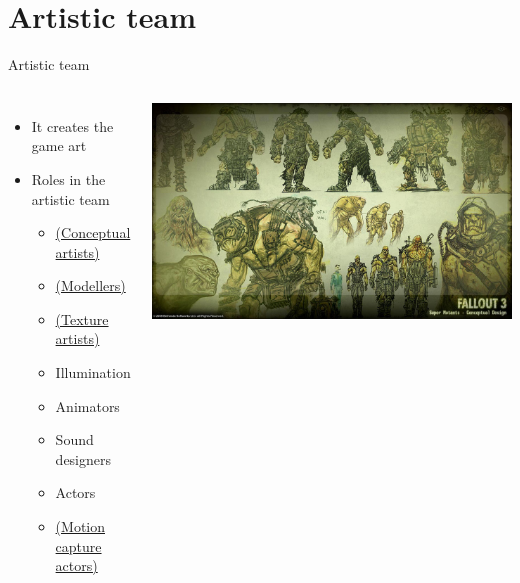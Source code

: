 \documentclass[10pt,compress]{beamer} %
\begin{document}
\section{Artistic team}
\begin{frame}{Artistic team}
    \begin{columns}
	\begin{itemize}
	\item It creates the game art
	\item Roles in the artistic team
		\begin{itemize}
		\item \href{https://www.google.es/search?espv=2&biw=1276&bih=702&tbm=isch&sa=1&q=arte+conceptual+videojuegos&oq=arte+conceptual+videojuegos&gs_l=img.3...0.0.0.116268.0.0.0.0.0.0.0.0..0.0.msedr...0...1c..64.img..0.0.0.8s-UmqTV-mo}{(Conceptual artists)}
		\item \href{https://www.google.es/search?espv=2&biw=1276&bih=702&tbm=isch&sa=1&q=modelos+3d+videojuegos&oq=modelos+3d+videojuegos&gs_l=img.3..0i24.2995.3432.0.3610.3.3.0.0.0.0.147.384.0j3.3.0.msedr...0...1c.1.64.img..2.1.122.nTWx2WYqhBc}{(Modellers)}
		\item \href{https://www.google.es/search?espv=2&biw=1276&bih=702&tbm=isch&sa=1&q=texturas&oq=texturas&gs_l=img.3..0l10.36936.37713.0.37839.8.7.0.0.0.0.208.593.0j3j1.4.0.msedr...0...1c.1.64.img..4.4.593.QFISF2dLU7U}{(Texture artists)}
		\item Illumination
		\item Animators
		\item Sound designers
		\item Actors
		\item \href{https://www.google.es/search?q=Motion+capture+actors&num=20&espv=2&source=lnms&tbm=isch&sa=X&ei=iRsZVeqlPM3fatHrgcAN&ved=0CAcQ_AUoAQ&biw=1276&bih=702}{(Motion capture actors)}
		\end{itemize}
	\end{itemize}
		\centering\includegraphics[width=\linewidth]{figs/concept14B}\\

\end{columns}
\end{frame}
\end{document}
